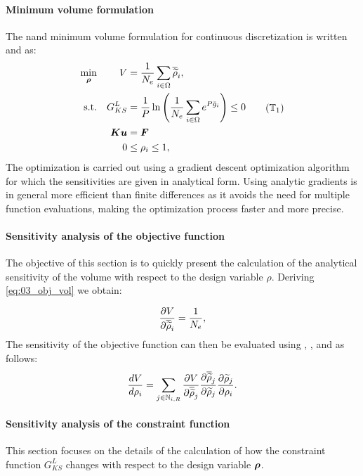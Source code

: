 \paragraph{Minimum volume formulation}
The \gls{nand} minimum volume formulation for continuous discretization is written  and  as:
\begin{equation}
    \begin{aligned}
    \min_{\bm{\rho}}         && V &= \frac{1}{N_{e}} \sum_{i \in \Omega} \rhophys_i,  \\
    \textrm{s.t.}   && G_{KS}^L &= \frac{1}{P} \ln{\left( \frac{1}{N_e} \sum_{i \in \Omega} e^{{P}\bar{g}_i} \right)} \leq 0 \\
    && \bm{K}\bm{u} &= \bm{F}\\
    && 0 &\leq \rho_i \leq 1, \\
    \end{aligned}
    \tag{$\mathbb{T}_1$}
    \label{eq:03_prob-stress}
\end{equation}
The optimization is carried out using a gradient descent optimization algorithm for which the sensitivities are given in analytical form. Using analytic gradients is in general more efficient than finite differences as it avoids the need for multiple function evaluations, making the optimization process faster and more precise.

\paragraph{Sensitivity analysis of the objective function}
The objective of this section is to quickly present the calculation of the analytical sensitivity of the volume with respect to the design variable $\rho$. Deriving \eqref{eq:03_obj_vol} we obtain:

\begin{equation}
    \frac{\partial V}{\partial\overline{\widetilde{\rho}}_i} = \frac{1}{N_{e}},
    \label{eq:03_01}
\end{equation}
The sensitivity of the objective function can then be evaluated using  , , and  as follows:
\begin{equation}
    \frac{d V}{d \rho_i} = \sum_{j \in \mathbb{N}_{i,R}} \frac{\partial V}{\partial\overline{\widetilde{\rho}}_j} \frac{\partial\overline{\widetilde{\rho}}_j}{\partial\widetilde{\rho}_j} \frac{\partial\widetilde{\rho}_j}{\partial\rho_i}.
\end{equation}
\paragraph{Sensitivity analysis of the constraint function}
This section focuses on the details of the calculation of how the constraint function $G_{KS}^L$ changes with respect to the design variable $\bm{\rho}$.

